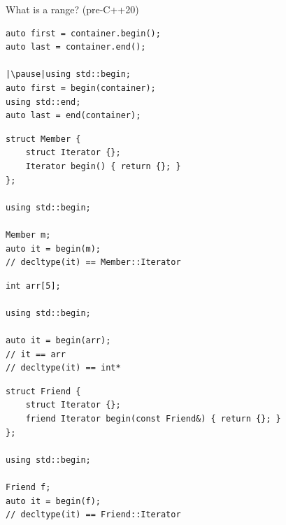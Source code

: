 \documentclass[aspectratio=169]{beamer}
\begin{document}

\begin{frame}[c]
    \Huge
    \begin{center}
        What is a range? (pre-C++20)
    \end{center}
\end{frame}

\begin{frame}[fragile,c]
\Large
\begin{center}
\begin{verbatim}
auto first = container.begin();
auto last = container.end();

|\pause|using std::begin; 
auto first = begin(container);
using std::end;
auto last = end(container);
\end{verbatim}
\end{center}
\end{frame}

\begin{frame}[fragile,c]
\Large
\begin{center}
\begin{verbatim}
struct Member {
    struct Iterator {};
    Iterator begin() { return {}; }
};

using std::begin;

Member m;
auto it = begin(m);
// decltype(it) == Member::Iterator
\end{verbatim}
\end{center}
\let\thefootnote\relax{}
\end{frame}

\begin{frame}[fragile,c]
\Large
\begin{center}
\begin{verbatim}
int arr[5];

using std::begin;

auto it = begin(arr);
// it == arr
// decltype(it) == int*
\end{verbatim}
\end{center}
\let\thefootnote\relax{}
\end{frame}

\begin{frame}[fragile,c]
\Large
\begin{center}
\begin{verbatim}
struct Friend {
    struct Iterator {};
    friend Iterator begin(const Friend&) { return {}; }
};

using std::begin;

Friend f;
auto it = begin(f);
// decltype(it) == Friend::Iterator
\end{verbatim}
\end{center}
\let\thefootnote\relax{}
\end{frame}
\end{document}
